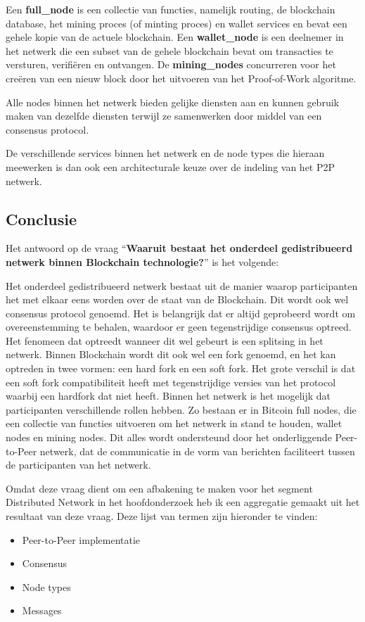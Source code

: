 Een \textbf{\gls{full_node}} is een collectie van functies, namelijk routing, de blockchain database, het mining proces (of minting proces) en wallet services en bevat een gehele kopie van de actuele blockchain. Een \textbf{\gls{wallet_node}} is een deelnemer in het netwerk die een subset van de gehele blockchain bevat om transacties te versturen, verifiëren en ontvangen. De \textbf{\glspl{mining_node}} concurreren voor het creëren van een nieuw block door het uitvoeren van het Proof-of-Work algoritme. 

Alle \glspl{node} binnen het netwerk bieden gelijke diensten aan en kunnen gebruik maken van dezelfde diensten terwijl ze samenwerken door middel van een consensus protocol.

De verschillende services binnen het netwerk en de \gls{node} types die hieraan meewerken is dan ook een architecturale keuze over de indeling van het \acrshort{P2P} netwerk.

\newpage
\subsection{Conclusie}

Het antwoord op de vraag ``\textbf{Waaruit bestaat het onderdeel gedistribueerd netwerk binnen Blockchain technologie?}'' is het volgende:

Het onderdeel gedistribueerd netwerk bestaat uit de manier waarop participanten het met elkaar eens worden over de staat van de Blockchain. Dit wordt ook wel consensus protocol genoemd. Het is belangrijk dat er altijd geprobeerd wordt om overeenstemming te behalen, waardoor er geen tegenstrijdige consensus optreed. Het fenomeen dat optreedt wanneer dit wel gebeurt is een splitsing in het netwerk. Binnen Blockchain wordt dit ook wel een fork genoemd, en het kan optreden in twee vormen: een hard fork en een soft fork. Het grote verschil is dat een soft fork compatibiliteit heeft met tegenstrijdige versies van het protocol waarbij een hardfork dat niet heeft. Binnen het netwerk is het mogelijk dat participanten verschillende rollen hebben. Zo bestaan er in Bitcoin full nodes, die een collectie van functies uitvoeren om het netwerk in stand te houden, wallet nodes en mining nodes. Dit alles wordt ondersteund door het onderliggende Peer-to-Peer netwerk, dat de communicatie in de vorm van berichten faciliteert tussen de participanten van het netwerk.

Omdat deze vraag dient om een afbakening te maken voor het segment Distributed Network in het hoofdonderzoek heb ik een aggregatie gemaakt uit het resultaat van deze vraag. Deze lijst van termen zijn hieronder te vinden:

\begin{itemize}[noitemsep]
  \item Peer-to-Peer implementatie
  \item Consensus
  \item Node types
  \item Messages
\end{itemize}